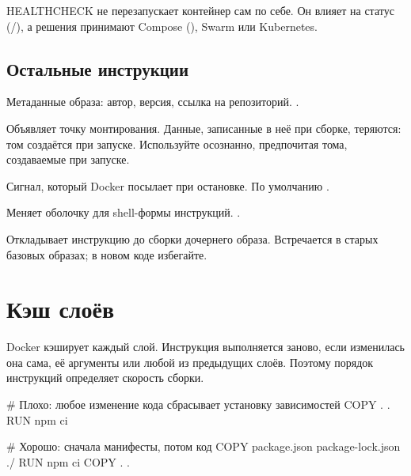 \begin{notebox}
HEALTHCHECK не перезапускает контейнер сам по себе. Он влияет на статус
(/), а решения принимают Compose
(), Swarm или Kubernetes.
\end{notebox}

\subsection{Остальные инструкции}

\begin{description}[style=nextline]
  \item[LABEL] Метаданные образа: автор, версия, ссылка на репозиторий.
        .
  \item[VOLUME] Объявляет точку монтирования. Данные, записанные в неё
        при сборке, теряются: том создаётся при запуске. Используйте
        осознанно, предпочитая тома, создаваемые при запуске.
  \item[STOPSIGNAL] Сигнал, который Docker посылает при остановке.
        По умолчанию .
  \item[SHELL] Меняет оболочку для shell-формы инструкций.
        .
  \item[ONBUILD] Откладывает инструкцию до сборки дочернего образа.
        Встречается в старых базовых образах; в новом коде избегайте.
\end{description}

\section{Кэш слоёв}

Docker кэширует каждый слой. Инструкция выполняется заново, если
изменилась она сама, её аргументы или любой из предыдущих слоёв.
Поэтому порядок инструкций определяет скорость сборки.

\begin{code}[language=dockerfile]
# Плохо: любое изменение кода сбрасывает установку зависимостей
COPY . .
RUN npm ci

# Хорошо: сначала манифесты, потом код
COPY package.json package-lock.json ./
RUN npm ci
COPY . .
\end{code}


